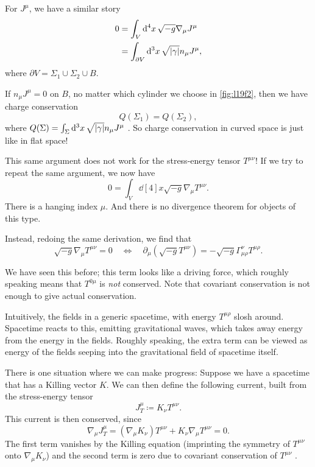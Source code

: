 For $J^{\mu}$, we have a similar story
\begin{align}
  0 &= \int_V \dd[4]{x} \sqrt{-g} \nabla_{\mu} J^{\mu} \\
  &= \int_{\partial V} \dd[3]{x} \sqrt{\abs{\gamma}} n_{\mu} J^{\mu},
\end{align}
where $\partial V = \Sigma_1 \cup \Sigma_2 \cup B$.

If $n_{\mu} J^{\mu} = 0$ on $B$, no matter which cylinder we choose in \ref{fig:l19f2}, then we have charge conservation
 \begin{equation}
  Q(\Sigma_1) = Q(\Sigma_2),
\end{equation}
where $Q(\Sigma) = \int_{\Sigma} \dd[3]{x} \sqrt{\abs{\gamma}} n_{\mu} J^{\mu}$ .
So charge conservation in curved space is just like in flat space!

This same argument does not work for the stress-energy tensor $T^{\mu\nu}$! 
If we try to repeat the same argument, we now have
\begin{equation}
  0 = \int_V \dd[4]{x} \sqrt{-g} \nabla_{\mu} T^{\mu\nu}.
\end{equation}
There is a hanging index $\mu$. And there is no divergence theorem for objects of this type.

Instead, redoing the same derivation, we find that
\begin{equation}
  \label{eq:19-1}
  \sqrt{-g} \nabla_{\mu} T^{\mu\nu} = 0 \quad \iff \quad \partial_{\mu} (\sqrt{-g} T^{\mu\nu}) = -\sqrt{-g} \Gamma^{\nu}_{\mu\rho} T^{\mu\rho}.
\end{equation}

We have seen this before; this term looks like a driving force, which roughly speaking means that $T^{0\mu}$ is \emph{not} conserved.
Note that covariant conservation is not enough to give actual conservation.

Intuitively, the fields in a generic spacetime, with energy $T^{\mu\rho}$ slosh around. Spacetime reacts to this, emitting gravitational waves, which takes away energy from the energy in the fields.
Roughly speaking, the extra term can be viewed as energy of the fields seeping into the gravitational field of spacetime itself.

There is one situation where we can make progress:
Suppose we have a spacetime that has a Killing vector $K$. We can then define the following current, built from the stress-energy tensor
 \begin{equation}
  J^{\mu}_T \coloneqq K_{\nu} T^{\mu\nu}.
\end{equation}
This current is then conserved, since
\begin{equation}
  \nabla_{\mu} J^{\mu}_T = (\nabla_{\mu} K_{\nu}) T^{\mu\nu} + K_{\nu} \nabla_{\mu} T^{\mu\nu} = 0.
\end{equation}
The first term vanishes by the Killing equation (imprinting the symmetry of $T^{\mu\nu}$ onto $\nabla_{\mu} K_{\nu}$) and the second term is zero due to covariant conservation of $T^{\mu\nu}$ .

